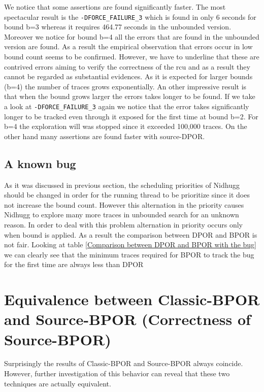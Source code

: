 We notice that some assertions are found significantly faster. The most spectacular result is the \verb|-DFORCE_FAILURE_3| which is found in only 6 seconds for bound b=3 whereas it requires 464.77 seconds in the unbounded version. Moreover we notice for bound b=4 all the errors that are found in the unbounded version are
found. As a result the empirical observation that errors occur in low bound count seems to be confirmed. However, we have to underline that these are contrived
errors aiming to verify the correctness of the rcu and as a result they cannot be regarded as substantial evidences. As it is expected for larger bounds (b=4) the number of traces
grows exponentially. An other impressive result is that when the bound grows larger the errors takes longer to be found. If we take a look at \verb|-DFORCE_FAILURE_3| again we notice that the error
takes significantly longer to be tracked even through it exposed for the first time at bound b=2. For b=4 the exploration will was stopped since it exceeded 100,000 traces.
On the other hand many assertions are found faster with source-DPOR.

\subsection{A known bug}
As it was discussed in previous section, the scheduling priorities of Nidhugg should be changed in order for the running thread to be prioritize since it does not
increase the bound count. However this alternation in the priority causes Nidhugg to explore many more traces in unbounded search for an unknown reason. In order to deal with
this problem alternation in priority occurs only when bound is applied. As a result the comparison between DPOR and BPOR is not fair. Looking at table \ref{Comparison between DPOR and BPOR with the bug}
we can clearly see that the minimum traces required for BPOR to track the bug for the first time are always less than DPOR


\section{Equivalence between Classic-BPOR and Source-BPOR (Correctness of Source-BPOR)}
Surprisingly the results of Classic-BPOR and Source-BPOR always coincide. However, further investigation of this behavior can reveal that these two techniques
are actually equivalent. 

